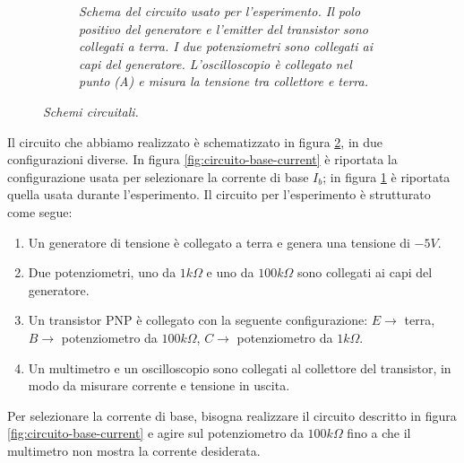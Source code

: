 \begin{figure}
\begin{subfigure}[t]{.47\textwidth}
      \caption{
        \emph{
          Schema del circuito usato per l'esperimento. Il polo positivo del generatore e l'\emph{emitter}
          del transistor sono collegati a terra. I due potenziometri sono collegati ai capi del generatore. L'oscilloscopio
          è collegato nel punto (A) e misura la tensione tra collettore e terra.
        }
      }
      \label{fig:circuito-prova}
    \end{subfigure}
    \caption{\emph{Schemi circuitali.}}
    \label{fig:circuiti}
  \end{figure}

  Il circuito che abbiamo realizzato è schematizzato in figura \ref{fig:circuiti}, in due configurazioni diverse. In figura \ref{fig:circuito-base-current}
  è riportata la configurazione usata per selezionare la corrente di base $I_b$; in figura \ref{fig:circuito-prova}
  è riportata quella usata durante l'esperimento. Il circuito per l'esperimento è strutturato come segue:
  \begin{enumerate}
    \item%
    Un generatore di tensione è collegato a terra e genera una tensione di $-5V$.
    \item
    Due potenziometri, uno da $1k\Omega$ e uno da $100k\Omega$ sono collegati ai capi del generatore.
    \item
    Un transistor PNP è collegato con la seguente configurazione: $E \to$ terra, $B \to$ potenziometro da $100k\Omega$,
    $C \to$ potenziometro da $1k\Omega$.
    \item
    Un multimetro e un oscilloscopio sono collegati al collettore del transistor, in modo da misurare corrente e tensione
    in uscita.
  \end{enumerate}
  Per selezionare la corrente di base, bisogna realizzare il circuito descritto in figura \ref{fig:circuito-base-current}
  e agire sul potenziometro da $100k\Omega$ fino a che il multimetro non mostra la corrente desiderata.

